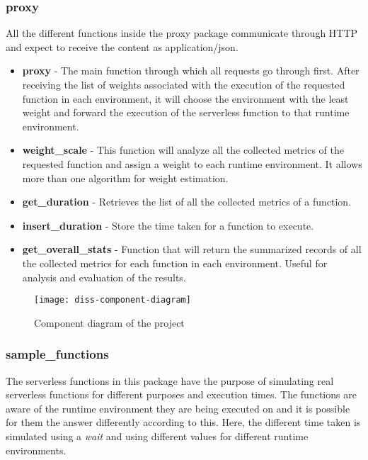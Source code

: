 \subsubsection*{proxy}


All the different functions inside the proxy package communicate through HTTP and
expect to receive the content as application/json.

\begin{itemize}
    \item \textbf{proxy} - The main function through which all requests go through
        first. After receiving the list of weights associated with the execution of
        the requested function in each environment, it will choose the environment
        with the least weight and forward the execution of the serverless function
        to that runtime environment.
    \item \textbf{weight\_scale} - This function will analyze all the collected 
        metrics of the requested function and assign a weight to each runtime environment. It allows more than one algorithm for weight estimation.
    \item \textbf{get\_duration} - Retrieves the list of all the collected
        metrics of a function.
    \item \textbf{insert\_duration} - Store the time taken for a function to
        execute.
    \item \textbf{get\_overall\_stats} - Function that will return the summarized
        records of all the collected metrics for each function in each environment. Useful for analysis and evaluation of the results.
\end{itemize}

\begin{figure}[ht]
  \begin{center}
    \texttt{[image: diss-component-diagram]}
    \caption{Component diagram of the project}
    \label{fig:component_diagram}
  \end{center}
\end{figure}

\subsubsection*{sample\_functions} \label{overview:sample_functions}

The serverless functions in this package have the purpose of simulating real serverless
functions for different purposes and execution times. The functions are aware of
the runtime environment they are being executed on and it is possible for them the answer
differently according to this. Here, the different time taken is simulated using a
\textit{wait} and using different values for different runtime environments.
 

